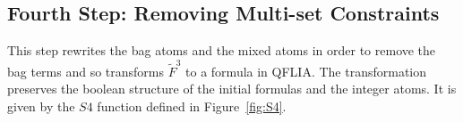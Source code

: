 
\subsection{Fourth Step: Removing Multi-set Constraints}
\label{subsec:rewritting qflia}
This step rewrites the bag atoms and the mixed atoms in order to remove the bag terms and so transforms $\tilde{F}^3$ to a formula in QFLIA.
The transformation preserves the boolean structure of the initial formulas and the integer atoms.
It is given by the $S4$ function defined in Figure~\ref{fig:S4}.

